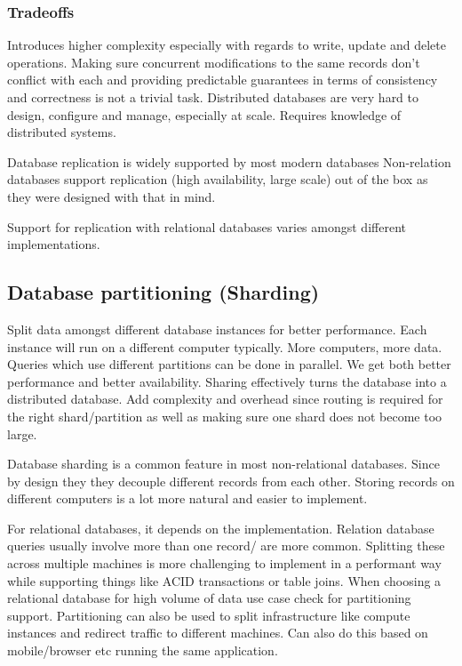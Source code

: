 \subsubsection{Tradeoffs}
Introduces higher complexity especially with regards to write, update and delete operations.
Making sure concurrent modifications to the same records don't conflict with each and providing predictable guarantees in terms of consistency and correctness is not a trivial task.
Distributed databases are very hard to design, configure and manage, especially at scale.
Requires knowledge of distributed systems.

Database replication is widely supported by most modern databases
Non-relation databases support replication (high availability, large scale) out of the box as they were designed with that in mind.

Support for replication with relational databases varies amongst different implementations.

\subsection{Database partitioning (Sharding)}
Split data amongst different database instances for better performance.
Each instance will run on a different computer typically.
More computers, more data.
Queries which use different partitions can be done in parallel.
We get both better performance and better availability.
Sharing effectively turns the database into a distributed database.
Add complexity and overhead since routing is required for the right shard/partition as well as making sure one shard does not become too large.

Database sharding is a common feature in most non-relational databases.
Since by design they they decouple different records from each other.
Storing records on different computers is a lot more natural and easier to implement.

For relational databases, it depends on the implementation.
Relation database queries usually involve more than one record/ are more common.
Splitting these across multiple machines is more challenging to implement in a performant way while supporting things like ACID transactions or table joins.
When choosing a relational database for high volume of data use case check for partitioning support.
Partitioning can also be used to split infrastructure like compute instances and redirect traffic to different machines.
Can also do this based on mobile/browser etc running the same application.

